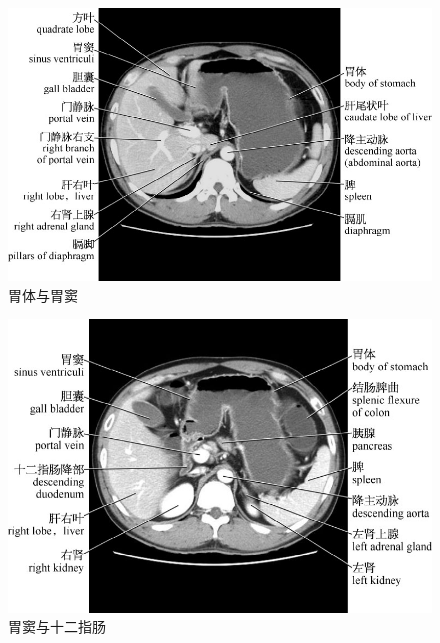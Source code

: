 \begin{figure}[!htbp]
 \centering
 \includegraphics{./images/Image00168.jpg}
 \captionsetup{justification=centering}
 \caption{胃体与胃窦}
  \end{figure} 
 \FloatBarrier

\begin{figure}[!htbp]
 \centering
 \includegraphics{./images/Image00169.jpg}
 \captionsetup{justification=centering}
 \caption{胃窦与十二指肠}
  \end{figure} 
 \FloatBarrier

